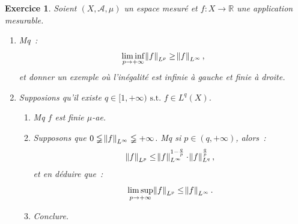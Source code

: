 \documentclass{article}
\newtheorem{ex}{Exercice}[section]
\newcommand{\pinfty}{{+\infty}}
\newcommand{\st}{\text{ s.t. }}
\newcommand{\R}{{\mathbb R}}
\begin{document}
\begin{ex} Soient $(X, \mathcal A, \mu)$ un espace mesuré et $f : X \to \R$ une application mesurable.
\begin{enumerate}
	\item Mq~:
	\[\liminf_{p \to \pinfty}\norm f_{L^p} \geq \norm f_{L^\infty},\]
	et donner un exemple où l'inégalité est infinie à gauche et finie à droite.
	\item Supposions qu'il existe $q \in [1, \pinfty) \st f \in L^q(X)$.
	\begin{enumerate}
		\item Mq $f$ est finie $\mu$-ae.
		\item Supposons que $0 \lneqq \norm f_{L^\infty} \lneqq \pinfty$. Mq si $p \in (q, \pinfty)$, alors~:
		\[\norm f_{L^p} \leq \norm f_{L^\infty}^{1-\frac qp} \cdot \norm f_{L^q}^{\frac qp},\]
		et en déduire que~:
		\[\limsup_{p \to \pinfty} \norm f_{L^p} \leq \norm f_{L^\infty}.\]
		\item Conclure.
	\end{enumerate}
\end{enumerate}
\end{ex}
\end{document}

